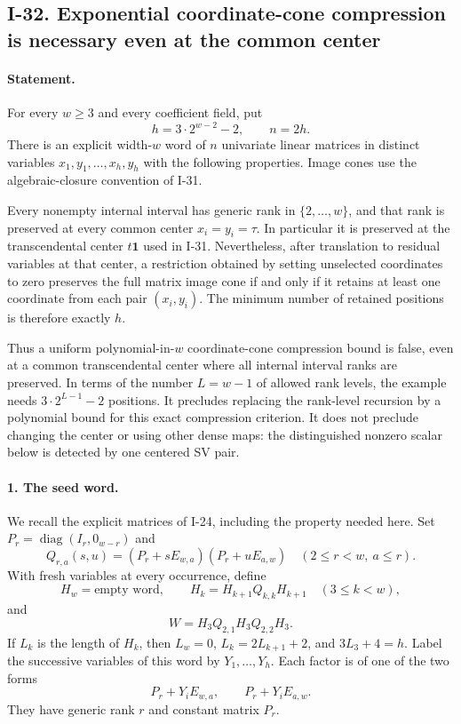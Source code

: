 \subsection{I-32. Exponential coordinate-cone compression is necessary even at the common center}
\label{I-32}

\paragraph{Statement.}
For every $w\geq3$ and every coefficient field, put
\[
 h=3\cdot2^{w-2}-2,\qquad n=2h.
\]
There is an explicit width-$w$ word of $n$ univariate linear
matrices in distinct variables $x_1,y_1,\ldots,x_h,y_h$ with
the following properties. Image cones use the algebraic-closure
convention of I-31.

Every nonempty internal interval has generic rank in
$\{2,\ldots,w\}$, and that rank is preserved at every common
center $x_i=y_i=\tau$. In particular it is preserved at the
transcendental center $t\mathbf1$ used in I-31. Nevertheless,
after translation to residual variables at that center, a
restriction obtained by setting unselected coordinates to zero
preserves the full matrix image cone if and only if it retains
at least one coordinate from each pair $(x_i,y_i)$. The minimum
number of retained positions is therefore exactly $h$.

Thus a uniform polynomial-in-$w$ coordinate-cone compression
bound is false, even at a common transcendental center where
all internal interval ranks are preserved. In terms of the
number $L=w-1$ of allowed rank levels, the example needs
$3\cdot2^{L-1}-2$ positions. It precludes replacing the rank-level
recursion by a polynomial bound for this exact compression
criterion. It does not preclude changing the center or using
other dense maps: the distinguished nonzero scalar below is
detected by one centered SV pair.

\paragraph{1. The seed word.}
We recall the explicit matrices of I-24, including the property
needed here. Set $P_r=\operatorname{diag}(I_r,0_{w-r})$ and
\[
 Q_{r,a}(s,u)=(P_r+sE_{w,a})(P_r+uE_{a,w})
       \quad(2\leq r<w,\ a\leq r).
\]
With fresh variables at every occurrence, define
\[
 H_w=\text{empty word},\qquad
 H_k=H_{k+1}Q_{k,k}H_{k+1}\quad(3\leq k<w),
\]
and
\[
 W=H_3Q_{2,1}H_3Q_{2,2}H_3.
\]
If $L_k$ is the length of $H_k$, then
$L_w=0$, $L_k=2L_{k+1}+2$, and
$3L_3+4=h$. Label the successive variables of this word by
$Y_1,\ldots,Y_h$. Each factor is of one of the two forms
\[
 P_r+Y_iE_{w,a},\qquad P_r+Y_iE_{a,w}.
 \tag{I.54}
\]
They have generic rank $r$ and constant matrix $P_r$.

